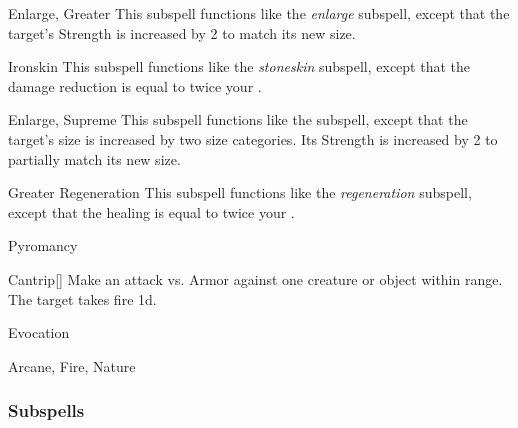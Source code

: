\begin{ability}[\nth{5}]{Enlarge, Greater}
This subspell functions like the \textit{enlarge} subspell, except that the target's Strength is increased by 2 to match its new size.
\end{ability}
\vspace{0.25em}


\begin{ability}[\nth{6}]{Ironskin}
This subspell functions like the \textit{stoneskin} subspell, except that the damage reduction is equal to twice your .
\end{ability}
\vspace{0.25em}


\begin{ability}[\nth{7}]{Enlarge, Supreme}
This subspell functions like the  subspell, except that the target's size is increased by two size categories.
Its Strength is increased by 2 to partially match its new size.
\end{ability}
\vspace{0.25em}


\begin{ability}[\nth{7}]{Greater Regeneration}
This subspell functions like the \textit{regeneration} subspell, except that the healing is equal to twice your .
\end{ability}
\vspace{0.25em}

\newpage
\begin{spellsection}{Pyromancy}

\begin{spellheader}
\end{spellheader}


\begin{ability}{Cantrip}[]
Make an attack vs. Armor against one creature or object within \rngmed range.
\hit The target takes fire  \minus1d.
\end{ability}




 Evocation

 Arcane, Fire, Nature
\end{spellsection}


\subsubsection{Subspells}


